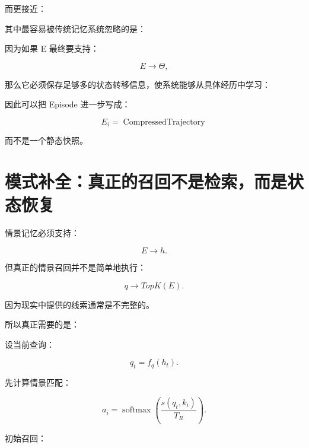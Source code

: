 而更接近：

\begin{statementbox}
\centering
{}
\end{statementbox}

其中最容易被传统记忆系统忽略的是：

\begin{statementbox}
\centering
{}
\end{statementbox}

因为如果 E 最终要支持：

\[
E\rightarrow\Theta,
\]

那么它必须保存足够多的状态转移信息，使系统能够从具体经历中学习：

\begin{statementbox}
\centering
{}
\end{statementbox}

因此可以把 Episode 进一步写成：

\[
\boxed{
E_i
=
\operatorname{CompressedTrajectory}
}
\]

而不是一个静态快照。


\section{模式补全：真正的召回不是检索，而是状态恢复}

情景记忆必须支持：

\[
\boxed{
E\rightarrow h.
}
\]

但真正的情景召回并不是简单地执行：

\[
q
\rightarrow
TopK(E).
\]

因为现实中提供的线索通常是不完整的。

所以真正需要的是：

\begin{statementbox}
\centering
{}
\end{statementbox}

设当前查询：

\[
q_t=f_q(h_t).
\]

先计算情景匹配：

\[
a_i
=
\operatorname{softmax}
\left(
\frac{s(q_t,k_i)}
{T_R}
\right).
\]

初始召回：

